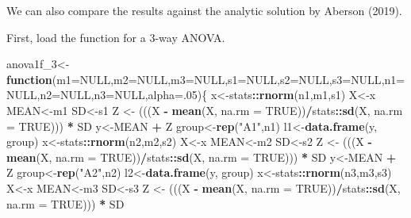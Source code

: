 \documentclass[]{book}
\newenvironment{Shaded}{\begin{snugshade}}{\end{snugshade}}
\newcommand{\ControlFlowTok}[1]{\textcolor[rgb]{0.13,0.29,0.53}{\textbf{#1}}}
\newcommand{\DataTypeTok}[1]{\textcolor[rgb]{0.13,0.29,0.53}{#1}}
\newcommand{\DecValTok}[1]{\textcolor[rgb]{0.00,0.00,0.81}{#1}}
\newcommand{\KeywordTok}[1]{\textcolor[rgb]{0.13,0.29,0.53}{\textbf{#1}}}
\newcommand{\NormalTok}[1]{#1}
\newcommand{\OperatorTok}[1]{\textcolor[rgb]{0.81,0.36,0.00}{\textbf{#1}}}
\newcommand{\OtherTok}[1]{\textcolor[rgb]{0.56,0.35,0.01}{#1}}
\newcommand{\StringTok}[1]{\textcolor[rgb]{0.31,0.60,0.02}{#1}}
\begin{document}
We can also compare the results against the analytic solution by Aberson (2019).

First, load the function for a 3-way ANOVA.

\begin{Shaded}
\begin{Highlighting}[]
\NormalTok{anova1f_}\DecValTok{3}\NormalTok{<-}\ControlFlowTok{function}\NormalTok{(}\DataTypeTok{m1=}\OtherTok{NULL}\NormalTok{,}\DataTypeTok{m2=}\OtherTok{NULL}\NormalTok{,}\DataTypeTok{m3=}\OtherTok{NULL}\NormalTok{,}\DataTypeTok{s1=}\OtherTok{NULL}\NormalTok{,}\DataTypeTok{s2=}\OtherTok{NULL}\NormalTok{,}\DataTypeTok{s3=}\OtherTok{NULL}\NormalTok{,}\DataTypeTok{n1=}\OtherTok{NULL}\NormalTok{,}\DataTypeTok{n2=}\OtherTok{NULL}\NormalTok{,}\DataTypeTok{n3=}\OtherTok{NULL}\NormalTok{,}\DataTypeTok{alpha=}\NormalTok{.}\DecValTok{05}\NormalTok{)\{}
\NormalTok{x<-stats}\OperatorTok{::}\KeywordTok{rnorm}\NormalTok{(n1,m1,s1)}
\NormalTok{X<-x}
\NormalTok{MEAN<-m1}
\NormalTok{SD<-s1}
\NormalTok{Z <-}\StringTok{ }\NormalTok{(((X }\OperatorTok{-}\StringTok{ }\KeywordTok{mean}\NormalTok{(X, }\DataTypeTok{na.rm =} \OtherTok{TRUE}\NormalTok{))}\OperatorTok{/}\NormalTok{stats}\OperatorTok{::}\KeywordTok{sd}\NormalTok{(X, }\DataTypeTok{na.rm =} \OtherTok{TRUE}\NormalTok{))) }\OperatorTok{*}\StringTok{ }\NormalTok{SD}
\NormalTok{y<-MEAN }\OperatorTok{+}\StringTok{ }\NormalTok{Z}
\NormalTok{group<-}\KeywordTok{rep}\NormalTok{(}\StringTok{"A1"}\NormalTok{,n1)}
\NormalTok{l1<-}\KeywordTok{data.frame}\NormalTok{(y, group)}
\NormalTok{x<-stats}\OperatorTok{::}\KeywordTok{rnorm}\NormalTok{(n2,m2,s2)}
\NormalTok{X<-x}
\NormalTok{MEAN<-m2}
\NormalTok{SD<-s2}
\NormalTok{Z <-}\StringTok{ }\NormalTok{(((X }\OperatorTok{-}\StringTok{ }\KeywordTok{mean}\NormalTok{(X, }\DataTypeTok{na.rm =} \OtherTok{TRUE}\NormalTok{))}\OperatorTok{/}\NormalTok{stats}\OperatorTok{::}\KeywordTok{sd}\NormalTok{(X, }\DataTypeTok{na.rm =} \OtherTok{TRUE}\NormalTok{))) }\OperatorTok{*}\StringTok{ }\NormalTok{SD}
\NormalTok{y<-MEAN }\OperatorTok{+}\StringTok{ }\NormalTok{Z}
\NormalTok{group<-}\KeywordTok{rep}\NormalTok{(}\StringTok{"A2"}\NormalTok{,n2)}
\NormalTok{l2<-}\KeywordTok{data.frame}\NormalTok{(y, group)}
\NormalTok{x<-stats}\OperatorTok{::}\KeywordTok{rnorm}\NormalTok{(n3,m3,s3)}
\NormalTok{X<-x}
\NormalTok{MEAN<-m3}
\NormalTok{SD<-s3}
\NormalTok{Z <-}\StringTok{ }\NormalTok{(((X }\OperatorTok{-}\StringTok{ }\KeywordTok{mean}\NormalTok{(X, }\DataTypeTok{na.rm =} \OtherTok{TRUE}\NormalTok{))}\OperatorTok{/}\NormalTok{stats}\OperatorTok{::}\KeywordTok{sd}\NormalTok{(X, }\DataTypeTok{na.rm =} \OtherTok{TRUE}\NormalTok{))) }\OperatorTok{*}\StringTok{ }\NormalTok{SD}

\end{Highlighting}
\end{Shaded}
\end{document}
